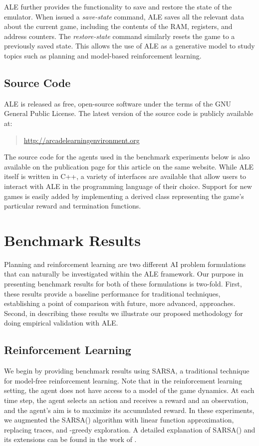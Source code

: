 \documentclass[twoside,11pt]{article}
\begin{document}
ALE further provides the functionality to save and restore the state of the emulator. 
When issued a \emph{save-state} command, ALE saves all the relevant data about the current game, including the contents of the RAM, registers, and address counters. 
The \emph{restore-state} command similarly resets the game to a previously saved state. 
This allows the use of ALE as a generative model to study topics such as planning and model-based reinforcement learning.

\subsection{Source Code}
ALE is released as free, open-source software under the terms of the GNU General Public License.
The latest version of the source code is publicly available at:
\begin{quote} 
\url{http://arcadelearningenvironment.org}
\end{quote}
The source code for the agents used in the benchmark experiments below is also available on the publication page for this article on the same website. While ALE itself is written in C++, a variety of interfaces are available that allow users to interact with ALE in the programming language of their choice. Support for new games is easily added by implementing a derived class representing the game's particular reward and termination functions. 

\section{Benchmark Results}
Planning and reinforcement learning are two different AI problem formulations that can naturally be investigated within the ALE framework. Our purpose in presenting benchmark results for both of these formulations is two-fold.  First, these results provide a baseline performance for traditional techniques, establishing a point of comparison with future, more advanced, approaches.  Second, in describing these results we illustrate our proposed methodology for doing empirical validation with ALE.

\subsection{Reinforcement Learning}
\label{sec:RL}

We begin by providing benchmark results using SARSA, a traditional technique for model-free reinforcement learning.
Note that in the reinforcement learning setting, the agent does not have access to a model of the game dynamics.
At each time step, the agent selects an action and receives a reward and an observation, and the agent's aim is to maximize its accumulated reward. 
In these experiments, we augmented the SARSA() algorithm with linear function approximation, replacing traces, and -greedy exploration. 
A detailed explanation of SARSA() and its extensions can be found in the work of . 
\end{document}

